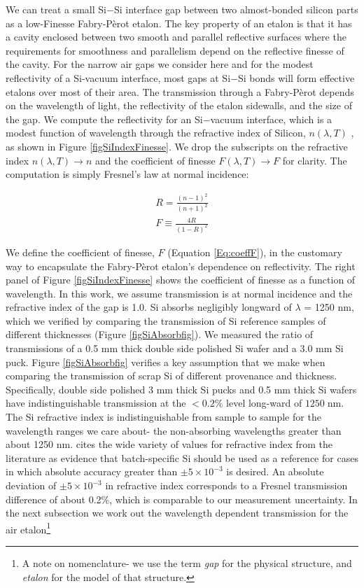 We can treat a small Si$-$Si interface gap between two almost-bonded silicon parts as a low-Finesse Fabry-P\`{e}rot etalon\cite{2007fuph.book.....S}.  The key property of an etalon is that it has a cavity enclosed between two smooth and parallel reflective surfaces where the requirements for smoothness and parallelism depend on the reflective finesse of the cavity.  For the narrow air gaps we consider here and for the modest reflectivity of a Si-vacuum interface, most gaps at Si$-$Si bonds will form effective etalons over most of their area.  The transmission through a Fabry-P\`{e}rot depends on the wavelength of light, the reflectivity of the etalon sidewalls, and the size of the gap.  We compute the reflectivity for an Si$-$vacuum interface, which is a modest function of wavelength through the refractive index of Silicon, $n(\lambda, T)$ \cite{2006SPIE.6273E..77F}, as shown in Figure \ref{figSiIndexFinesse}.  We drop the subscripts on the refractive index $n(\lambda, T) \rightarrow n$ and the coefficient of finesse $F(\lambda, T) \rightarrow F$ for clarity.  The computation is simply Fresnel's law at normal incidence:

\begin{eqnarray}
R = \frac{(n-1)^2}{(n+1)^2} \label{Eq:FresnelR}\\
F \equiv \frac{4R}{(1-R)^2} \label{Eq:coeffF}
\end{eqnarray}

We define the coefficient of finesse\cite{2007fuph.book.....S}, $F$ (Equation \ref{Eq:coeffF}), in the customary way to encapsulate the Fabry-P\`{e}rot etalon's dependence on reflectivity.  The right panel of Figure \ref{figSiIndexFinesse} shows the coefficient of finesse as a function of wavelength.  In this work, we assume transmission is at normal incidence and the refractive index of the gap is 1.0.  Si absorbs negligibly longward of $\lambda$ = 1250 nm, which we verified by comparing the transmission of Si reference samples of different thicknesses (Figure \ref{figSiAbsorbfig}).  We measured the ratio of transmissions of a 0.5 mm thick double side polished Si wafer and a 3.0 mm Si puck.  Figure \ref{figSiAbsorbfig} verifies a key assumption that we make when comparing the transmission of scrap Si of different provenance and thickness.  Specifically, double side polished 3 mm thick Si pucks and 0.5 mm thick Si wafers have indistinguishable transmission at the $<0.2$\% level long-ward of $1250\;$nm.  The Si refractive index is indistinguishable from sample to sample for the wavelength ranges we care about- the non-absorbing wavelengths greater than about 1250 nm.  \cite{2006SPIE.6273E..77F} cites the wide variety of values for refractive index from the literature as evidence that batch-specific Si should be used as a reference for cases in which absolute accuracy greater than $\pm5\times10^{-3}$ is desired.  An absolute deviation of $\pm5\times10^{-3}$ in refractive index corresponds to a Fresnel transmission difference of about 0.2\%, which is comparable to our measurement uncertainty.  In the next subsection we work out the wavelength dependent transmission for the air etalon\footnote{A note on nomenclature- we use the term \emph{gap} for the physical structure, and \emph{etalon} for the model of that structure.}

